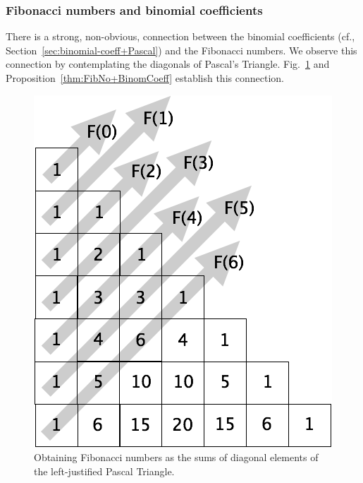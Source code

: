 \subsubsection{Fibonacci numbers and binomial coefficients}
\label{sec:FibNo+BinomCoeff}


\noindent
There is a strong, non-obvious, connection between the binomial coefficients (cf., Section~\ref{sec:binomial-coeff+Pascal}) and the Fibonacci numbers.  We observe this connection by contemplating the diagonals of Pascal's Triangle.  Fig.~\ref{fig:FiboPascal} and Proposition~\ref{thm:FibNo+BinomCoeff} establish this connection.
\begin{figure}[htb]
\begin{center}
        \includegraphics[scale=0.3]{FiguresMaths//FiboPascal1}
\caption{Obtaining Fibonacci numbers as the sums of diagonal elements of the left-justified Pascal Triangle.}
\label{fig:FiboPascal}
\end{center}
\end{figure}

